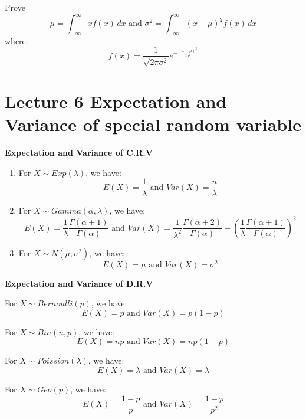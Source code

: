 \documentclass{article}
\begin{document}
\begin{quiz}
    Prove
    $$ \mu = \int^\infty_{-\infty}xf(x) \, dx \text{ and } \sigma^2 = \int^\infty_{-\infty}(x-\mu)^2f(x) \, dx$$
    where:
    $$ f(x) = \frac{1}{\sqrt{2\pi\sigma^2}}e^{-\frac{(x - \mu)^2}{2\sigma^2}}$$
\end{quiz}


\section{Lecture 6 Expectation and Variance of special random variable}
\begin{theorem}
    \textbf{Expectation and Variance of C.R.V}
    \begin{enumerate}
        \item For $X \sim Exp(\lambda)$, we have:
        $$ E(X) = \frac{1}{\lambda} \text{ and } Var(X) = \frac{n}{\lambda}$$
        \item For $X \sim Gamma(\alpha, \lambda)$, we have:
        $$ E(X) = \frac{1}{\lambda}\frac{\Gamma(\alpha+1)}{\Gamma(\alpha)}\text{ and } Var(X) = \frac{1}{\lambda^2}\frac{\Gamma(\alpha+2)}{\Gamma(\alpha)} - (\frac{1}{\lambda}\frac{\Gamma(\alpha+1)}{\Gamma(\alpha)})^2$$
        \item For $X \sim N(\mu, \sigma^2)$, we have:
        $$ E(X) = \mu \text{ and } Var(X) = \sigma^2$$
    \end{enumerate}
\end{theorem}

\begin{theorem}
    \textbf{Expectation and Variance of D.R.V}
    \item For $X \sim Bernoulli(p)$, we have:
    $$ E(X) = p \text{ and } Var(X) = p(1-p)$$
    \item For $X \sim Bin(n, p)$, we have:
    $$ E(X) = np \text{ and } Var(X) = np(1-p)$$
    \item For $X \sim Poission(\lambda)$, we have:
    $$ E(X) = \lambda \text{ and } Var(X) = \lambda$$
    \item For $X \sim Geo(p)$, we have:
    $$ E(X) = \frac{1-p}{p} \text{ and } Var(X) =\frac{1-p}{p^2}$$
\end{theorem}
\end{document}
